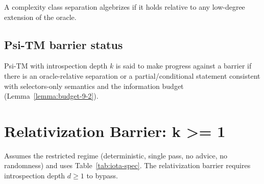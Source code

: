 \begin{definition}
A complexity class separation algebrizes if it holds relative to any low-degree extension of the oracle\citep{AaronsonWigderson2008}.
\end{definition}

\subsection{Psi-TM barrier status}

\begin{definition}
Psi-TM with introspection depth $k$ is said to make progress against a barrier if there is an oracle-relative separation or a partial/conditional statement consistent with selectors-only semantics and the information budget (Lemma~\ref{lemma:budget-9-2}).
\end{definition}

\section{Relativization Barrier: k >= 1}

\begin{theorem}
Assumes the restricted regime (deterministic, single pass, no advice, no randomness) and uses Table~\ref{tab:iota-spec}.
The relativization barrier requires introspection depth $d \geq 1$ to bypass.
\end{theorem}

